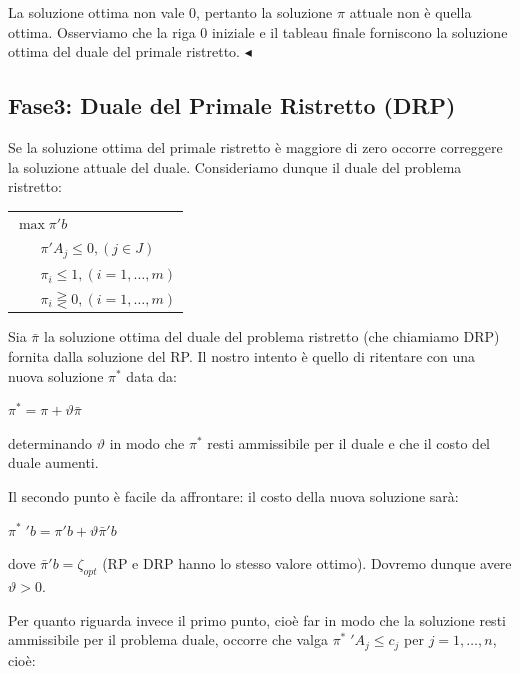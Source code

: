 \documentclass[11pt]{book}
\begin{document}
La soluzione ottima non vale 0, pertanto la soluzione $\pi$ attuale
non \`e quella ottima. Osserviamo che la riga 0 iniziale e il tableau
finale forniscono la soluzione ottima del duale del primale
ristretto. $\blacktriangleleft$
\vspace{11pt}

\subsection{Fase3: Duale del Primale Ristretto (DRP)}

Se la soluzione ottima del primale ristretto \`e maggiore di zero
occorre correggere la soluzione attuale del duale. Consideriamo dunque
il duale del problema ristretto:

\vspace{11pt}
\begin{center}
\begin{tabular}{l}
$\max \pi'b$\\
$\phantom{min}\pi'A_j \leq 0, (j\in J)$\\
$\phantom{min}\pi_i \leq 1, (i=1,\dots,m)$\\
$\phantom{min}\pi_i \gtreqless 0, (i=1,\dots,m)$\\
\end{tabular}
\end{center}
\vspace{11pt}

Sia $\bar{\pi}$ la soluzione ottima del duale del problema ristretto
(che chiamiamo DRP) fornita dalla soluzione del RP. Il nostro intento
\`e quello di ritentare con una nuova soluzione $\pi^*$ data da:

\begin{center}
$\pi^* = \pi + \vartheta\bar{\pi}$
\end{center}

determinando $\vartheta$ in modo che $\pi^*$ resti ammissibile per il
duale e che il costo del duale aumenti.

Il secondo punto \`e facile da affrontare: il costo della nuova
soluzione sar\`a:

\begin{center}
$\pi^* \phantom{.}' b = \pi'b + \vartheta\bar{\pi}'b$
\end{center}

dove $\bar{\pi}'b = \zeta_{opt}$ (RP e DRP hanno lo stesso valore
ottimo). Dovremo dunque avere $\vartheta > 0$.

Per quanto riguarda invece il primo punto, cio\`e far in modo che la
soluzione resti ammissibile per il problema duale, occorre che valga
$\pi^* \phantom{.}' A_j \leq c_j$ per $j=1,\dots,n$, cio\`e:
\end{document}
